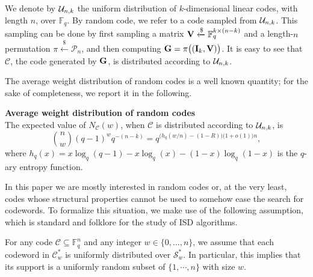 We denote by $\mathcal{U}_{n,k}$ the uniform distribution of $k$-dimensional linear codes, with length $n$, over $\mathbb F_q$.
By random code, we refer to a code sampled from $\mathcal{U}_{n,k}$.
This sampling can be done by first sampling a matrix $\mathbf V\xleftarrow{\$}\mathbb F_q^{k\times(n-k)}$ and a length-$n$ permutation $\pi \xleftarrow{\$} \mathscr P_n$, and then computing 
$\mathbf G = \pi\big((\mathbf I_k, \mathbf V)\big)$. It is easy to see that $\mathscr C$, the code generated by $\mathbf G$, is distributed according to $\mathcal{U}_{n,k}$.

The average weight distribution of random codes is a well known quantity; for the sake of completeness, we report it in the following.
\begin{theorem}\label{the:average_weight}\textbf{Average weight distribution of random codes}\\
The expected value of $N_{\mathscr C}(w)$, when $\mathscr C$ is distributed according to $\mathcal{U}_{n,k}$, is
$$\binom{n}{w}(q-1)^wq^{-(n-k)} = q^{\big(h_q(w/n)-(1-R)\big)\big(1+o(1)\big)n},$$
where $h_q(x) = x\log_q(q-1) - x\log_q(x)-(1-x)\log_q(1-x)$ is the $q$-ary entropy function.
\end{theorem}
In this paper we are mostly interested in random codes or, at the very least, codes whose structural properties cannot be used to somehow ease the search for codewords.
To formalize this situation, we make use of the following assumption, which is standard and folklore for the study of ISD algorithms. 
\begin{assumption}\label{ass:random_cw}
For any code $\mathscr C\subseteq \mathbb F_q^n$ and any integer $w\in\{0,\ldots,n\}$, we assume that each codeword in $\mathscr C_w^*$ is uniformly distributed over $\mathscr S^*_w$.
In particular, this implies that its support is  a uniformly random subset of $\{1,\cdots,n\}$ with size $w$.
\end{assumption}
